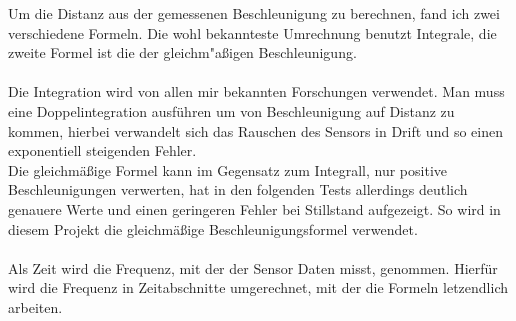 Um die Distanz aus der gemessenen Beschleunigung zu berechnen,
fand ich zwei verschiedene Formeln. Die wohl bekannteste Umrechnung 
benutzt Integrale, die zweite Formel ist die der gleichm"aßigen 
Beschleunigung.\\
\\
Die Integration wird von allen mir bekannten Forschungen verwendet. 
Man muss eine Doppelintegration
ausführen um von Beschleunigung auf Distanz zu kommen, hierbei verwandelt 
sich das Rauschen des Sensors in Drift und so einen exponentiell steigenden
Fehler. \\ 
Die gleichmäßige Formel kann im Gegensatz zum Integrall, nur positive 
Beschleunigungen verwerten, hat in den folgenden Tests allerdings 
deutlich genauere Werte und einen geringeren Fehler bei Stillstand 
aufgezeigt. So wird in diesem Projekt die gleichmäßige Beschleunigungsformel 
verwendet.\\
\\
Als Zeit wird die Frequenz, mit der der Sensor Daten misst, 
genommen. Hierfür wird die Frequenz in Zeitabschnitte umgerechnet, mit 
der die Formeln letzendlich arbeiten.